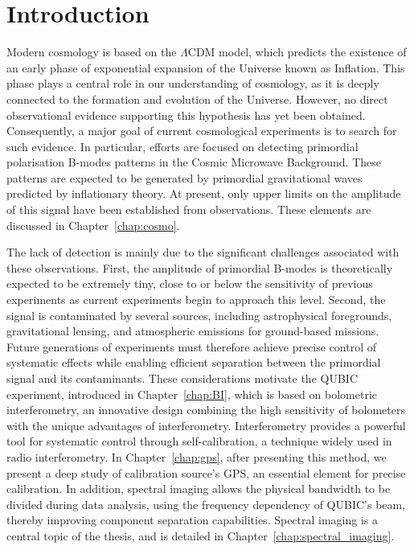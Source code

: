 \documentclass[../../thesis.tex]{subfiles}
\begin{document}
\chapter*{Introduction}


Modern cosmology is based on the $\Lambda$CDM model, which predicts the existence of an early phase of exponential expansion of the Universe known as Inflation. This phase plays a central role in our understanding of cosmology, as it is deeply connected to the formation and evolution of the Universe. However, no direct observational evidence supporting this hypothesis has yet been obtained. Consequently, a major goal of current cosmological experiments is to search for such evidence. In particular, efforts are focused on detecting primordial polarisation B-modes patterns in the Cosmic Microwave Background. These patterns are expected to be generated by primordial gravitational waves predicted by inflationary theory. At present, only upper limits on the amplitude of this signal have been established from observations. These elements are discussed in Chapter~\ref{chap:cosmo}.

The lack of detection is mainly due to the significant challenges associated with these observations. First, the amplitude of primordial B-modes is theoretically expected to be extremely tiny, close to or below the sensitivity of previous experiments as current experiments begin to approach this level. Second, the signal is contaminated by several sources, including astrophysical foregrounds, gravitational lensing, and atmospheric emissions for ground-based missions. Future generations of experiments must therefore achieve precise control of systematic effects while enabling efficient separation between the primordial signal and its contaminants. These considerations motivate the QUBIC experiment, introduced in Chapter~\ref{chap:BI}, which is based on bolometric interferometry, an innovative design combining the high sensitivity of bolometers with the unique advantages of interferometry. Interferometry provides a powerful tool for systematic control through self-calibration, a technique widely used in radio interferometry. In Chapter~\ref{chap:gps}, after presenting this method, we present a deep study of calibration source's GPS, an essential element for precise calibration. In addition, spectral imaging allows the physical bandwidth to be divided during data analysis, using the frequency dependency of QUBIC's beam, thereby improving component separation capabilities. Spectral imaging is a central topic of the thesis, and is detailed in Chapter~\ref{chap:spectral_imaging}.
\end{document}
